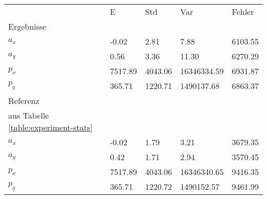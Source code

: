 \begin{tabular}{l|l|l|l|l}

     & E   & Std    & Var    & Fehler \\
\hhline{=|=|=|=|=}

Ergebnisse & & & & \\
$a_x$  &        -0.02 &         2.81 &         7.88 &      6103.55 \\
$a_y$  &         0.56 &         3.36 &        11.30 &      6270.29 \\
$p_x$  &      7517.89 &      4043.06 &  16346334.59 &      6931.87 \\
$p_y$  &       365.71 &      1220.71 &   1490137.68 &      6863.37 \\

\hline
Referenz & & & & \\
aus Tabelle  \ref{table:experiment-stats} & & & & \\
$a_x$  &        -0.02 &         1.79 &         3.21 &      3679.35 \\
$a_y$  &         0.42 &         1.71 &         2.94 &      3570.45 \\
$p_x$  &      7517.89 &      4043.06 &  16346340.65 &      9416.35 \\
$p_y$  &       365.71 &      1220.72 &   1490152.57 &      9461.99 \\
\end{tabular}
